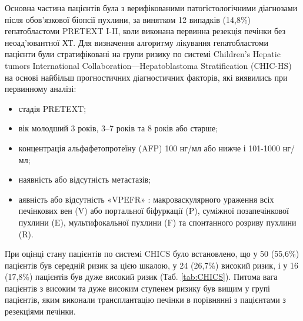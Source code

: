 Основна частина пацієнтів була з верифікованими патогістологічними діагнозами після обов'язкової біопсії пухлини, за винятком 12 випадків (14,8\%) гепатобластоми PRETEXT I-II, коли виконана первинна резекція печінки без неоад’ювантної ХТ.
Для визначення алгоритму лікування гепатобластоми пацієнти були стратифіковані на групи ризику по системі Children’s Hepatic tumors International Collaboration—Hepatoblastoma Stratification (CHIC-HS) на основі найбільш прогностичних діагностичних факторів, які виявились при первинному аналізі: 

\begin{itemize}
    \item стадія PRETEXT; 
    \item вік молодший 3 років, 3–7 років та 8 років або старше;
    \item концентрація альфафетопротеїну (AFP) 100 нг/мл або нижче і 101-1000 нг/мл;
    \item наявність або відсутність метастазів;
    \item аявність або відсутність «VPEFR» : макроваскулярного ураження всіх печінкових вен (V) або портальної біфуркації (P), суміжної позапечінкової пухлини (E), мультифокальної пухлини (F) та спонтанного розриву пухлини (R).
\end{itemize}

При оцінці стану пацієнтів по системі CHICS було встановлено, що у 50 (55,6\%) пацієнтів був середній ризик за цією шкалою, у 24 (26,7\%) високий ризик, і у 16 (17,8\%) пацієнтів був дуже високий ризик  (Таб. \ref{tab:CHICS}). Питома вага пацієнтів з високим та дуже високим ступенем ризику був вищим у групі пацієнтів, яким виконали трансплантацію печінки в порівнянні з пацієнтами з резекціями печінки.






